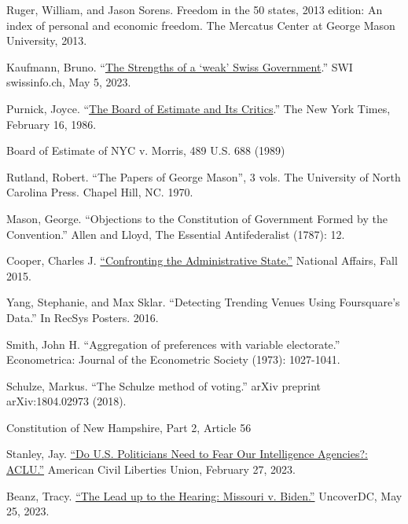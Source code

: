 \documentclass{article}
\newcommand{\quotes}[1]{``#1''}
\begin{document}
\begin{thebibliography}{20}
Ruger, William, and Jason Sorens. Freedom in the 50 states, 2013 edition: An index of personal and economic freedom. The Mercatus Center at George Mason University, 2013.

Kaufmann, Bruno. \quotes{\href{https://www.swissinfo.ch/eng/business/the-strengths-of-a--weak--swiss-government/48483858. }{The Strengths of a ‘weak’ Swiss Government}.} SWI swissinfo.ch, May 5, 2023. 

Purnick, Joyce. \quotes{\href{https://www.nytimes.com/1986/02/16/weekinreview/the-board-of-estimate-and-its-critics.html}{The Board of Estimate and Its Critics}.} The New York Times, February 16, 1986.

Board of Estimate of NYC v. Morris, 489 U.S. 688 (1989)

Rutland, Robert. \quotes{The Papers of George Mason}, 3 vols. The University of North Carolina Press. Chapel Hill, NC. 1970.

Mason, George. \quotes{Objections to the Constitution of Government Formed by the Convention.} Allen and Lloyd, The Essential Antifederalist (1787): 12.

Cooper, Charles J. \href{https://www.nationalaffairs.com/publications/detail/confronting-the-administrative-state}{\quotes{Confronting the Administrative State.}} National Affairs, Fall 2015.

Yang, Stephanie, and Max Sklar. \quotes{Detecting Trending Venues Using Foursquare's Data.} In RecSys Posters. 2016.

Smith, John H. \quotes{Aggregation of preferences with variable electorate.} Econometrica: Journal of the Econometric Society (1973): 1027-1041.

Schulze, Markus. \quotes{The Schulze method of voting.} arXiv preprint arXiv:1804.02973 (2018).

Constitution of New Hampshire, Part 2, Article 56

Stanley, Jay. \href{https://www.aclu.org/news/national-security/do-us-politicians-need-fear-our-intelligence}{\quotes{Do U.S. Politicians Need to Fear Our Intelligence Agencies?: ACLU.}} American Civil Liberties Union, February 27, 2023.

Beanz, Tracy. \href{https://www.uncoverdc.com/2023/05/24/the-lead-up-to-the-hearing-missouri-v-biden/}{\quotes{The Lead up to the Hearing: Missouri v. Biden.}} UncoverDC, May 25, 2023. 


\end{thebibliography}
\end{document}
